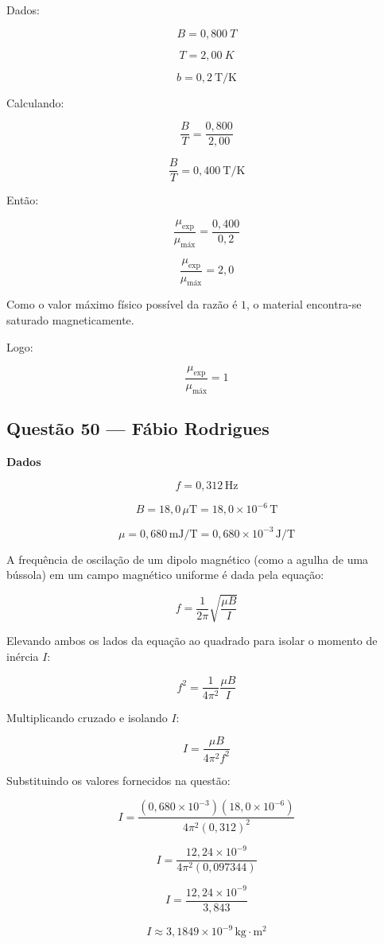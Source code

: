 \documentclass[12pt,a4paper]{article}
\begin{document}
Dados:

\[
B=0,800\ T
\]

\[
T=2,00\ K
\]

\[
b=0,2\ \text{T/K}
\]

Calculando:

\[
\frac{B}{T}
=
\frac{0,800}{2,00}
\]

\[
\frac{B}{T}=0,400\ \text{T/K}
\]

Então:

\[
\frac{\mu_{\text{exp}}}{\mu_{\text{máx}}}
=
\frac{0,400}{0,2}
\]

\[
\frac{\mu_{\text{exp}}}{\mu_{\text{máx}}}=2,0
\]

Como o valor máximo físico possível da razão é \(1\), o material encontra-se saturado magneticamente.

Logo:

\[
\frac{\mu_{\text{exp}}}{\mu_{\text{máx}}}=1
\]

\subsection{Questão 50 — Fábio Rodrigues}
\textbf{Dados}

\[
f = 0,312\,\text{Hz}
\]

\[
B = 18,0\,\mu\text{T} = 18,0 \times 10^{-6}\,\text{T}
\]

\[
\mu = 0,680\,\text{mJ/T} = 0,680 \times 10^{-3}\,\text{J/T}
\]

A frequência de oscilação de um dipolo magnético (como a agulha de uma bússola) em um campo magnético uniforme é dada pela equação:

\[
f = \frac{1}{2\pi} \sqrt{\frac{\mu B}{I}}
\]

Elevando ambos os lados da equação ao quadrado para isolar o momento de inércia \(I\):

\[
f^2 = \frac{1}{4\pi^2} \frac{\mu B}{I}
\]

Multiplicando cruzado e isolando \(I\):

\[
I = \frac{\mu B}{4\pi^2 f^2}
\]

Substituindo os valores fornecidos na questão:

\[
I = \frac{(0,680 \times 10^{-3})(18,0 \times 10^{-6})}{4\pi^2 (0,312)^2}
\]

\[
I = \frac{12,24 \times 10^{-9}}{4\pi^2 (0,097344)}
\]

\[
I = \frac{12,24 \times 10^{-9}}{3,843}
\]

\[
I \approx 3,1849 \times 10^{-9}\,\text{kg}\cdot\text{m}^2
\]
\end{document}
